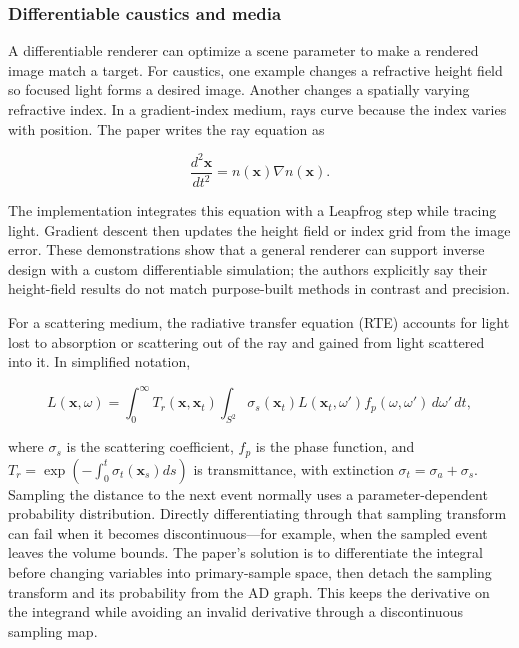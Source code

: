 \subsubsection{Differentiable caustics and media}\label{03-visual-computing-i-ch011-differentiable-caustics-and-media}

\hypertarget{03-visual-computing-i-ch011-differentiable-caustics-and-media}{}

A differentiable renderer can optimize a scene parameter to make a rendered image match a target. For caustics, one example changes a refractive height field so focused light forms a desired image. Another changes a spatially varying refractive index. In a gradient-index medium, rays curve because the index varies with position. The paper writes the ray equation as

\[\frac{d^2\mathbf{x}}{dt^2}=n(\mathbf{x})\nabla n(\mathbf{x}).\]

The implementation integrates this equation with a Leapfrog step while tracing light. Gradient descent then updates the height field or index grid from the image error. These demonstrations show that a general renderer can support inverse design with a custom differentiable simulation; the authors explicitly say their height-field results do not match purpose-built methods in contrast and precision.

For a scattering medium, the radiative transfer equation (RTE) accounts for light lost to absorption or scattering out of the ray and gained from light scattered into it. In simplified notation,

\[L(\mathbf{x},\omega)=\int_0^\infty T_r(\mathbf{x},\mathbf{x}_t)\int_{S^2}\sigma_s(\mathbf{x}_t)L(\mathbf{x}_t,\omega')f_p(\omega,\omega')\,d\omega'\,dt,\]

where \(\sigma_s\) is the scattering coefficient, \(f_p\) is the phase function, and \(T_r=\exp(-\int_0^t\sigma_t(\mathbf{x}_s)ds)\) is transmittance, with extinction \(\sigma_t=\sigma_a+\sigma_s\). Sampling the distance to the next event normally uses a parameter-dependent probability distribution. Directly differentiating through that sampling transform can fail when it becomes discontinuous---for example, when the sampled event leaves the volume bounds. The paper's solution is to differentiate the integral before changing variables into primary-sample space, then detach the sampling transform and its probability from the AD graph. This keeps the derivative on the integrand while avoiding an invalid derivative through a discontinuous sampling map.

